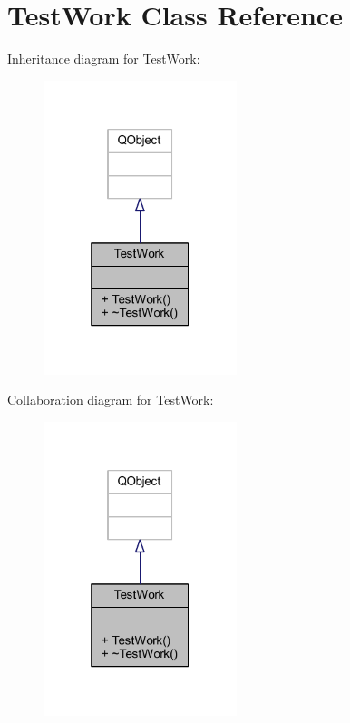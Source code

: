 \hypertarget{class_test_work}{}\section{Test\+Work Class Reference}
\label{class_test_work}


Inheritance diagram for Test\+Work\+:\nopagebreak
\begin{figure}[H]
\begin{center}
\leavevmode
\includegraphics[width=160pt]{d8/dc0/class_test_work__inherit__graph}
\end{center}
\end{figure}


Collaboration diagram for Test\+Work\+:\nopagebreak
\begin{figure}[H]
\begin{center}
\leavevmode
\includegraphics[width=160pt]{d0/d00/class_test_work__coll__graph}
\end{center}
\end{figure}


